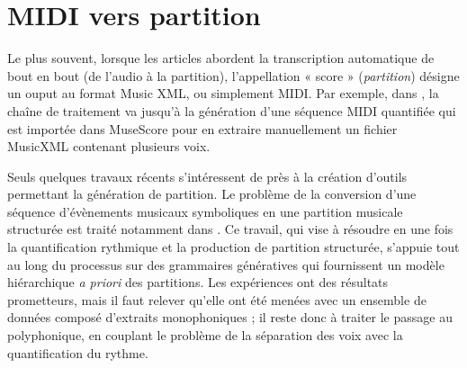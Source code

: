 \section{MIDI vers partition}
Le plus souvent, lorsque les articles abordent la transcription automatique de bout en bout (de l’audio à la partition), l’appellation « score » (\textit{partition}) désigne un ouput au format Music XML, ou simplement MIDI. 
Par exemple, dans \cite{SHIBATA2021262}, la chaîne de traitement va jusqu’à la génération d’une séquence MIDI quantifiée qui est importée dans MuseScore 
pour en extraire manuellement un fichier MusicXML contenant plusieurs voix.

Seuls quelques travaux récents s’intéressent de près à la création d’outils permettant la génération de partition. 
Le problème de la conversion d'une séquence d'évènements musicaux symboliques 
en une partition musicale structurée est traité notamment dans \cite{foscarin:hal-01988990}. 
Ce travail, qui vise à résoudre en une fois 
la quantification rythmique et la production de partition structurée, 
s’appuie tout au long du processus sur des grammaires génératives qui fournissent un modèle hiérarchique 
\textit{a priori} des partitions. 
Les expériences ont des résultats prometteurs, mais il faut relever qu’elle ont été menées avec un ensemble de données composé d'extraits monophoniques ; 
il reste donc à traiter le passage au polyphonique, 
en couplant le problème de la séparation des voix avec la quantification du rythme.

